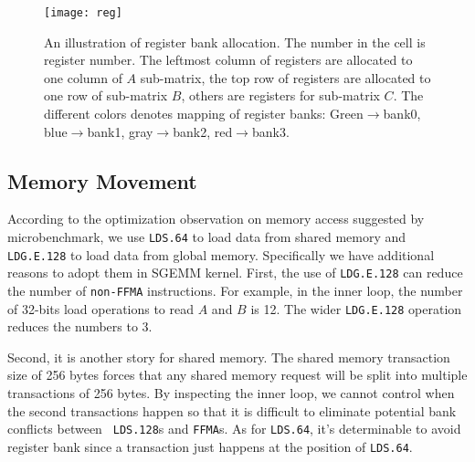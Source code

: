 \begin{figure}[htbp]
\begin{center}
\texttt{[image: reg]}
\caption{An illustration of register bank allocation. The number in the cell is register number.
    The leftmost column of registers are allocated to one column of $A$ sub-matrix, the
top row of registers are allocated to one row of sub-matrix $B$, others are registers for
sub-matrix $C$. The different colors denotes mapping of register banks: Green$\rightarrow$bank0, 
blue$\rightarrow$bank1, gray$\rightarrow$bank2, red$\rightarrow$bank3.}
\label{fig:reg}
\end{center}
\end{figure}


\subsection{Memory Movement}
According to the optimization observation on memory access suggested by microbenchmark, we use {\tt LDS.64} to load 
data from shared memory and {\tt LDG.E.128} to load data from global memory. Specifically we have additional reasons to 
adopt them in SGEMM kernel. First, the use of {\tt LDG.E.128} can reduce the number of {\tt non-FFMA} instructions. For 
example,  in the inner loop, the number of 32-bits load operations to read $A$ and $B$ is 12. The wider {\tt LDG.E.128} 
operation reduces the numbers to 3.

Second, it is another story for shared memory. The shared memory transaction size of 256 bytes forces that any shared 
memory request will be split into multiple transactions of 256 bytes. By inspecting the inner loop, we cannot control 
when the second transactions happen so that it is difficult to eliminate potential bank conflicts between {\tt 
LDS.128}s and {\tt FFMA}s. As for {\tt LDS.64}, it's determinable to avoid register bank since a transaction just 
happens at the position of {\tt LDS.64}.

